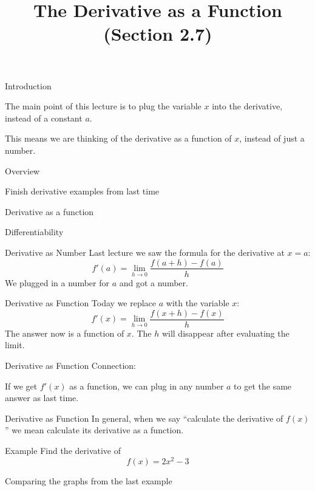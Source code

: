 \documentclass[t]{beamer}
\title{The Derivative as a Function (Section 2.7)}
\date{}
\newenvironment{fpi}
  {\itemize[nolistsep,itemsep=\fill]}
  {\vfill\enditemize}
\begin{document}
\frame{\titlepage}

\begin{frame}{Introduction}
\begin{fpi}
\item The main point of this lecture is to plug the variable $x$ into the derivative, instead of a constant $a$.
\item This means we are thinking of the derivative as a function of $x$, instead of just a number.
\end{fpi}
\end{frame}

\begin{frame}{Overview}
\begin{fpi}
\item Finish derivative examples from last time
\item Derivative as a function
\item Differentiability
\end{fpi}
\end{frame}

\begin{frame}{Derivative as Number}
Last lecture we saw the formula for the derivative at $x = a$:
$$ f'(a) = \lim_{h \to 0} \frac{f(a + h) - f(a)}{h} $$
We plugged in a number for $a$ and got a number.
\end{frame}

\begin{frame}{Derivative as Function}
Today we replace $a$ with the variable $x$:
$$ f'(x) = \lim_{h \to 0} \frac{f(x + h) - f(x)}{h}$$
The answer now is a function of $x$.  The $h$ will disappear after evaluating the limit.
\end{frame}

\begin{frame}{Derivative as Function}
Connection:

If we get $f'(x)$ as a function, we can plug in any number $a$ to get the same
answer as last time.  
\end{frame}

\begin{frame}{Derivative as Function}
In general, when we say ``calculate the derivative of $f(x)$'' we mean calculate
its derivative as a function.
\end{frame}

\begin{frame}{Example}
Find the derivative of
$$f(x) = 2x^2 - 3$$
\end{frame}

\begin{frame}{Comparing the graphs from the last example}

\end{frame}
\end{document}
